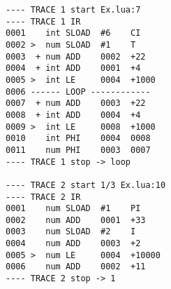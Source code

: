 \begin{multicols}{2}
\begin{lstlisting}[style=DumpStyle]
---- TRACE 1 start Ex.lua:7
---- TRACE 1 IR
0001    int SLOAD  #6    CI
0002 >  num SLOAD  #1    T
0003  + num ADD    0002  +22 
0004  + int ADD    0001  +4  
0005 >  int LE     0004  +1000
0006 ------ LOOP ------------
0007  + num ADD    0003  +22 
0008  + int ADD    0004  +4  
0009 >  int LE     0008  +1000
0010    int PHI    0004  0008
0011    num PHI    0003  0007
---- TRACE 1 stop -> loop

---- TRACE 2 start 1/3 Ex.lua:10
---- TRACE 2 IR
0001    num SLOAD  #1    PI
0002    num ADD    0001  +33 
0003    num SLOAD  #2    I
0004    num ADD    0003  +2  
0005 >  num LE     0004  +10000
0006    num ADD    0002  +11 
---- TRACE 2 stop -> 1
\end{lstlisting}
\end{multicols}

